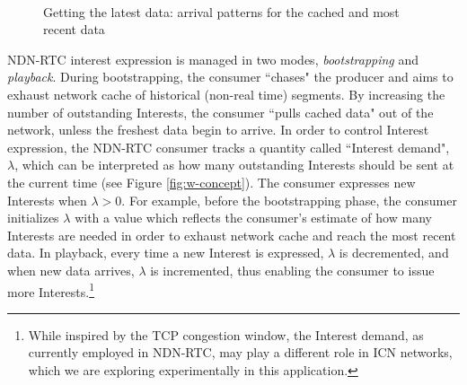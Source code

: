 \documentclass{icn/sig-alternate-2013} %
\newcommand{\ndnrtcName}{NDN-RTC} %
\newcommand{\wConcept}{Interest demand}
\begin{document}


\begin{figure}[t!]
\centering

\\

\caption{Getting the latest data: arrival patterns for the cached and most recent data}
\label{fig:inter-arrival}
\end{figure}

\ndnrtcName{} interest expression is managed in two modes, \textit{bootstrapping} and \textit{playback}.  %
During bootstrapping, the consumer ``chases" the producer and aims to exhaust network cache of historical (non-real time) segments. By increasing the number of outstanding Interests, the consumer ``pulls cached data" out of the network, unless the freshest data begin to arrive.  In order to control Interest expression, the \ndnrtcName{} consumer tracks a quantity called ``\wConcept{}",  $\lambda$, which can be interpreted as how many outstanding Interests should be sent at the current time (see Figure \ref{fig:w-concept}). The consumer expresses new Interests when $\lambda > 0$. For example, before the bootstrapping phase, the consumer initializes $\lambda$ with a value which reflects the consumer's estimate of how many Interests are needed in order to exhaust network cache and reach the most recent data. In playback, every time a new Interest is expressed, $\lambda$ is decremented, and when new data arrives, $\lambda$ is incremented, thus enabling the consumer to issue more Interests.\footnote{While inspired by the TCP congestion window, the \wConcept{}, as currently employed in \ndnrtcName{}, may play a different role in ICN networks, which we are exploring experimentally in this application.} 
\end{document}
